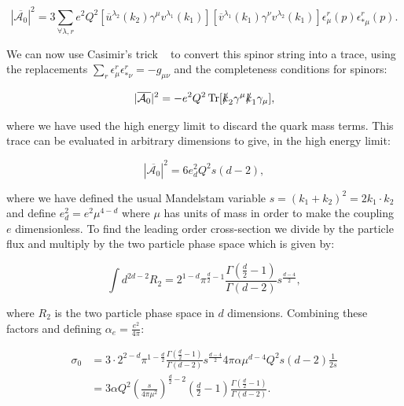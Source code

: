 			\begin{equation}
				|\overline{\mathcal{A}_0}|^2 = 3\sum_{\forall\lambda, r}e^2Q^2[\overline{u}^{\lambda_2}(k_2)\gamma^\mu
				v^{\lambda_1}(k_1)][\overline{v}^{\lambda_1}(k_1)\gamma^\nu v^{\lambda_2}(k_1)]\epsilon^r_\mu(p)\epsilon^r_{*\mu}(p).
			\end{equation}

			We can now use Casimir's trick ~\cite{griff} to convert this spinor string into a trace, using the replacements
			$\sum_r\epsilon^r_\mu\epsilon^r_{*\nu}=-g_{\mu\nu}$ and the completeness conditions for spinors:

			\begin{equation}
				|\overline{\mathcal{A}_0}|^2 = - e^2Q^2\operatorname{Tr}[\slashed k_2\gamma^\mu\slashed k_1\gamma_\mu],
			\end{equation}

			where we have used the high energy limit to discard the quark mass terms.  This trace can be evaluated in arbitrary
			dimensions to give, in the high energy limit:

			\begin{equation}
				|\overline{\mathcal{A}_0}|^2 = 6e_d^2Q^2s(d-2),
			\end{equation}

			where we have defined the usual Mandelstam variable $s=(k_1+k_2)^2=2k_1\cdot k_2$ and define $e_d^2=e^2\mu^{4-d}$ where
			$\mu$ has units of mass in order to make the coupling $e$ dimensionless.  To find the leading order cross-section we divide by the
			particle flux and multiply by the two particle phase space which is given by:

			\begin{equation}
				\int d^{2d-2}R_2 = 2^{1-d}\pi^{\frac{d}{2}-1}\frac{\Gamma(\frac{d}{2}-1)}{\Gamma(d-2)}s^\frac{d-4}{2},
			\end{equation}

			where $R_2$ is the two particle phase space in $d$ dimensions.  Combining these factors and defining $\alpha_e=\frac{e^2}{4\pi}$:

			\begin{equation}
			\begin{split}
				\sigma_0 &= 3\cdot2^{2-d}\pi^{1-\frac{d}{2}}\frac{\Gamma(\frac{d}{2}-1)}{\Gamma(d-2)}s^\frac{d-4}{2}4\pi\alpha\mu^{d-4}Q^2s(d-2)\frac{1}{2s} \\
				&= 3\alpha Q^2\left(\frac{s}{4\pi\mu^2}\right)^{\frac{d}{2}-2}\left(\frac{d}{2}-1\right)\frac{\Gamma(\frac{d}{2}-1)}{\Gamma(d-2)}.
			\end{split}
			\end{equation}

